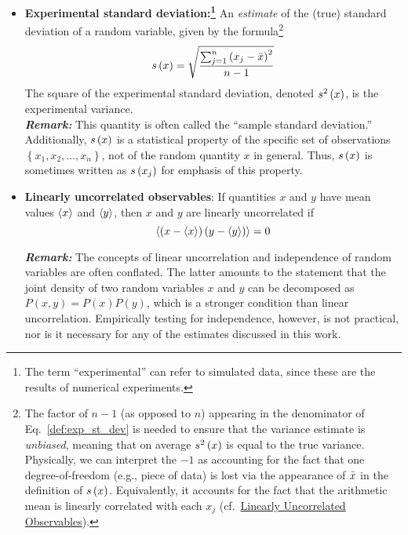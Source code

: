 \begin{itemize}
\item {\bf Experimental standard deviation:\footnote{
      The term ``experimental'' can refer to simulated data, since these are the results of numerical experiments.
}
} An \emph{estimate} of the (true) standard deviation of a random variable, given by the formula\footnote{The factor of $n-1$ (as opposed to $n$) appearing in the denominator of Eq.~\ref{def:exp_st_dev} is needed to ensure that the variance estimate is {\it unbiased}, meaning that on average $s^2\left( x \right)$ is equal to the true variance. Physically, we can interpret the $-1$ as accounting for the fact that one degree-of-freedom (e.g., piece of data) is lost via the appearance of $\bar{x}$ in the definition of $s\left( x \right)$.  Equivalently, it accounts for the fact that the arithmetic mean is linearly correlated with each $x_j$ (cf.\ \hyperref[def:unc_obs]{Linearly Uncorrelated Observables}).}
  \begin{equation}
    s\left( x \right) = \sqrt{\dfrac{\sum_{j=1}^n\left(x_j - \bar{x}\right)^2}{n-1}} \label{def:exp_st_dev}
  \end{equation}
  \smallskip
  The square of the experimental standard deviation, denoted $s^2\left( x \right)$, is the experimental variance.\\
  \textbf{\textit{Remark:}} This quantity is often called the ``sample standard deviation.''
  Additionally, $s\left( x \right)$ is a statistical property of the specific set of observations $\left\{x_1,x_2,...,x_n\right\}$, not of the random quantity $x$ in general.
  Thus, $s\left( x \right)$ is sometimes written as $s\left( x_j \right)$ for emphasis of this property.

  \item {\bf Linearly uncorrelated observables}:  If quantities $x$ and $y$ have mean values $\langle x \rangle$ and $\langle y \rangle$, then $x$ and $y$ are linearly uncorrelated if
\begin{equation}
  \langle  \left(x - \langle x \rangle \right) \left(y - \langle y \rangle \right)  \rangle = 0 \label{def:unc_obs}
\end{equation}

\textbf{\textit{Remark:}} The concepts of linear uncorrelation and independence of random variables are often conflated.  The latter amounts to the statement that the joint density of two random variables $x$ and $y$ can be decomposed as $P(x,y)=P(x)P(y)$, which is a stronger condition than linear uncorrelation.  Empirically testing for independence, however, is not practical, nor is it necessary for any of the estimates discussed in this work.


\end{itemize}
